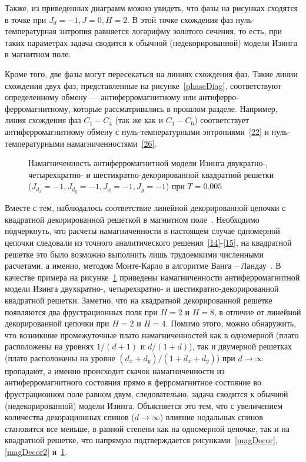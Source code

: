 Также, из приведенных диаграмм можно увидеть, что фазы на рисунках сходятся в точке при $J_d=-1, J=0, H=2$. В этой точке схождения фаз нуль-температурная энтропия равняется логарифму золотого сечения, то есть, при таких параметрах задача сводится к обычной (недекорированной) модели Изинга в магнитном поле.

Кроме того, две фазы могут пересекаться на линиях схождения фаз. Такие линии схождения двух фаз, представленные на рисунке~\ref{phaseDiag}, соответствуют определенному обмену --- антиферромагнитному или антиферро-ферромагнитному, которые рассматривались в прошлом разделе. Например, линия схождения фаз $C_1-C_4$ (так же как и $C_1-C_6$) соответствует антиферромагнитному обмену с нуль-температурными энтропиями~\eqref{22} и нуль-температурными намагниченностями~\eqref{26}.

 \begin{figure}[h]
 	\caption{Намагниченность антиферромагнитной модели Изинга двукратно-, четырехкратно- и шестикратно-декорированной квадратной решетки ($J_{d_x}=-1, J_{d_y}=-1, J_x=-1, J_y=-1$) при $T=0.005$}
 	\label{magDecorSquare}
 \end{figure}

Вместе с тем, наблюдалось соответствие линейной декорированной цепочки с квадратной декорированной решеткой в магнитном поле~\cite{kassan-ogly2020}. Необходимо подчеркнуть, что расчеты намагниченности в настоящем случае одномерной цепочки следовали из точного аналитического решения~\eqref{14}-\eqref{15}, на квадратной решетке это было возможно выполнить лишь трудоемкими численными расчетами, а именно, методом Монте-Карло в алгоритме Ванга -- Ландау~\cite{wang1,wang2}. В качестве примера на рисунке~\ref{magDecorSquare} приведены намагниченности антиферромагнитной модели Изинга двухкратно-, четырехкратно- и шестикратно-декорированной квадратной решетки. Заметно, что на квадратной декорированной решетке появляются два фрустрационных поля при $H=2$ и $H=8$, в отличие от линейной декорированной цепочки при $H=2$ и $H=4$. Помимо этого, можно обнаружить, что возникшие промежуточные плато намагниченностей как в одномерной (плато расположены на уровнях $1/(d+1)$ и $d/(1+d)$), так и двумерной решетках (плато расположены на уровне $(d_x+d_y)/(1+d_x+d_y)$) при $d \rightarrow \infty$ пропадают, а именно происходит скачок намагниченности из антиферромагнитного состояния прямо в ферромагнитное состояние во фрустрационном поле равном двум, следовательно, задача сводится к обычной (недекорированной) модели Изинга. Объясняется это тем, что с увеличением количества декорационных спинов ($d\rightarrow \infty$) влияние нодальных спинов становится все меньше, в равной степени как на одномерной цепочке, так и на квадратной решетке, что напрямую подтверждается рисунками~\ref{magDecor}, \ref{magDecor2} и~\ref{magDecorSquare}.

